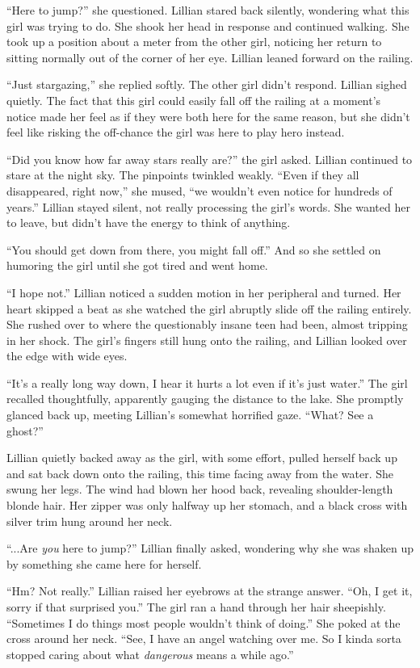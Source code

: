 \begin{Standard}
``Here to jump?'' she questioned. Lillian stared back silently, wondering what this girl
was trying to do. She shook her head in response and continued walking. She took up a position
about a meter from the other girl, noticing her return to sitting normally out of the corner of her eye.
Lillian leaned forward on the railing.

``Just stargazing,'' she replied softly. The other girl didn't respond. Lillian sighed quietly.
The fact that this girl could easily fall off the railing at a moment's notice made her feel
as if they were both here for the same reason, but she didn't feel like risking the off-chance
the girl was here to play hero instead.

``Did you know how far away stars really are?'' the girl asked. Lillian continued to stare
at the night sky. The pinpoints twinkled weakly. ``Even if they all disappeared, right now,''
she mused, ``we wouldn't even notice for hundreds of years.'' Lillian stayed silent, not
really processing the girl's words. She wanted her to leave, but didn't have the energy to
think of anything.

``You should get down from there, you might fall off.'' And so she settled on humoring the girl
until she got tired and went home.

``I hope not.'' Lillian noticed a sudden motion in her peripheral and turned. Her heart skipped
a beat as she watched the girl abruptly slide off the railing entirely. She rushed over to
where the questionably insane teen had been, almost tripping in her shock. The girl's
fingers still hung onto the railing, and Lillian looked over the edge with wide eyes.

``It's a really long way down, I hear it hurts a lot even if it's just water.'' The girl
recalled thoughtfully, apparently gauging the distance to the lake. She promptly glanced
back up, meeting Lillian's somewhat horrified gaze. ``What? See a ghost?''

Lillian quietly backed away as the girl, with some effort, pulled herself back up and
sat back down onto the railing, this time facing away from the water. She swung her legs.
The wind had blown her hood back, revealing shoulder-length blonde hair. Her zipper was
only halfway up her stomach, and a black cross with silver trim hung around her neck.

``...Are \emph{you} here to jump?'' Lillian finally asked, wondering why she was
shaken up by something she came here for herself.

``Hm? Not really.'' Lillian raised her eyebrows at the strange answer. ``Oh, I get it,
sorry if that surprised you.'' The girl ran a hand through her hair sheepishly.
``Sometimes I do things most people wouldn't think of doing.'' She poked at the
cross around her neck. ``See, I have an angel watching over me. So I kinda sorta
stopped caring about what \emph{dangerous} means a while ago.''


\end{Standard}
